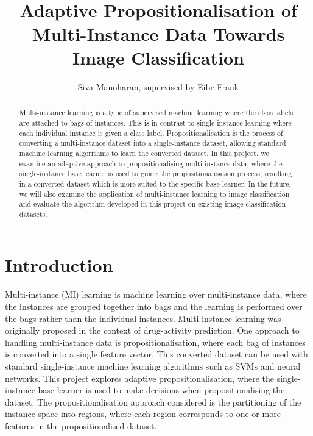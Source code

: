 \documentclass[a4paper,12pt]{report} %
\title{\ \\ \  \\ Adaptive Propositionalisation of Multi-Instance Data Towards Image Classification}
\author{Siva Manoharan, supervised by Eibe Frank}
\date{} %
\begin{document}
\onehalfspacing
{}  %

\maketitle 
\begin{abstract}
Multi-instance learning is a type of supervised machine learning 
    where the class labels are attached to bags of instances. 
This is in contrast to single-instance learning 
    where each individual instance is given a class label.
Propositionalisation is the process of 
    converting a multi-instance dataset into a single-instance dataset, 
    allowing standard machine learning algorithms to learn the converted dataset. 
In this project, 
    we examine an adaptive approach to propositionalising multi-instance data, 
    where the single-instance base learner is 
    used to guide the propositionalisation process, 
    resulting in a converted dataset 
    which is more suited to the specific base learner.
In the future, 
    we will also examine the application of multi-instance learning 
    to image classification and 
    evaluate the algorithm developed in this project 
    on existing image classification datasets.
\end{abstract}

\thispagestyle{empty}
\clearpage
{}  

\chapter{Introduction} 

Multi-instance (MI) learning is 
    machine learning over multi-instance data, 
    where the instances are grouped together into bags and 
    the learning is performed over the bags 
    rather than the individual instances.
Multi-instance learning was originally proposed 
    in the context of drug-activity prediction.
One approach to handling multi-instance data is propositionalisation, 
    where each bag of instances is converted into 
    a single feature vector. 
This converted dataset can be used with 
    standard single-instance machine learning algorithms 
    such as SVMs and neural networks.
This project explores adaptive propositionalisation, 
    where the single-instance base learner is used to 
    make decisions when propositionalising the dataset. 
The propositionalisation approach considered is the 
    partitioning of the instance space into regions, 
    where each region corresponds to 
    one or more features in the propositionalised dataset.
\end{document}
